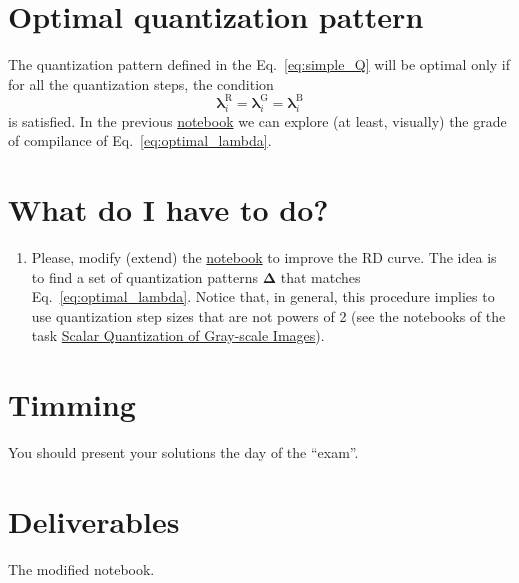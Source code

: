 \section{Optimal quantization pattern}
\label{sec:optimal_RD}
The quantization pattern defined in the Eq.~\eqref{eq:simple_Q} will
be optimal only if for all the quantization steps, the condition
\begin{equation}
  \mathbf{\lambda}^{\text{R}}_i = \mathbf{\lambda}^{\text{G}}_i =
  \mathbf{\lambda}^{\text{B}}_i
  \label{eq:optimal_lambda}
\end{equation}
is satisfied. In the previous
\href{https://github.com/Sistemas-Multimedia/Sistemas-Multimedia.github.io/blob/master/contents/RGB_SQ/RGB_SQ.ipynb}{notebook}
we can explore (at least, visually) the grade of compilance of
Eq.~\eqref{eq:optimal_lambda}.

\section{What do I have to do?}

\begin{enumerate}
\item
  Please, modify (extend) the
  \href{https://github.com/Sistemas-Multimedia/Sistemas-Multimedia.github.io/blob/master/contents/RGB_SQ/RGB_SQ.ipynb}{notebook}
  to improve the RD curve. The idea is to find a set of quantization
  patterns $\mathbf\Delta$ that matches
  Eq.~\eqref{eq:optimal_lambda}. Notice that, in general, this
  procedure implies to use quantization step sizes that are not powers
  of 2 (see the notebooks of the task
  \href{https://sistemas-multimedia.github.io/contents/gray_SQ/}{Scalar
    Quantization of Gray-scale Images}).

\end{enumerate}

\section{Timming}

You should present your solutions the day of the ``exam''.

\section{Deliverables}

The modified notebook.

